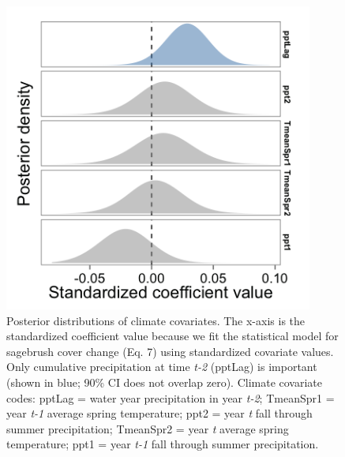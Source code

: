 \documentclass[12pt,]{article}
\begin{document}
\begin{figure}[!ht]
  \centering
      \includegraphics[width=4in]{../figures/post_climate_covariates.png}
  \caption{Posterior distributions of climate covariates. The x-axis is the standardized coefficient value because we fit the statistical model for sagebrush cover change (Eq. 7) using standardized covariate values. Only cumulative precipitation at time \emph{t-2} (pptLag) is important (shown in blue; 90\% CI does not overlap zero). Climate covariate codes: pptLag = water year precipitation in year \emph{t-2}; TmeanSpr1 = year \emph{t-1} average spring temperature; ppt2 = year \emph{t} fall through summer precipitation; TmeanSpr2 = year \emph{t} average spring temperature; ppt1 = year \emph{t-1} fall through summer precipitation.}
\end{figure}

\newpage{}
\end{document}
